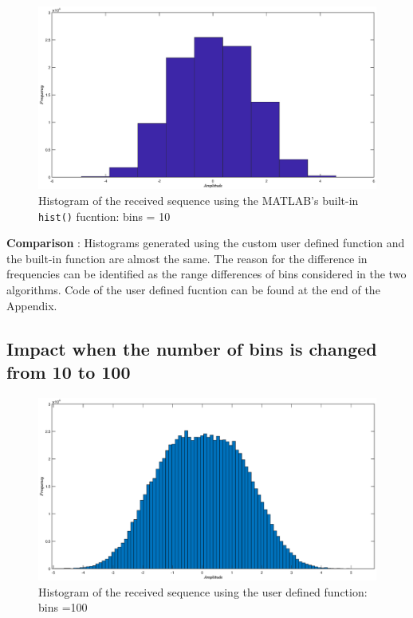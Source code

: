 \documentclass[a4paper,11pt]{article}%
\begin{document}
\begin{figure}[!h]
	\centering
	\includegraphics[scale=0.45]{figures/q5f3}
	\caption{Histogram of the received sequence using the MATLAB's built-in {\tt hist()} fucntion: bins = 10}
\end{figure}

\textbf{Comparison} : Histograms generated using the custom user defined function and the built-in function are almost the same. The reason for the difference in frequencies can be identified as the range differences of bins considered in the two algorithms. Code of the user defined fucntion can be found at the end of the Appendix.

\pagebreak
\subsection{Impact when the number of bins is changed from 10 to 100}

\begin{figure}[!h]
	\centering
	\includegraphics[scale=0.45]{figures/q5f4}
	\caption{Histogram of the received sequence using the user defined function: bins =100}
\end{figure}
\end{document}
